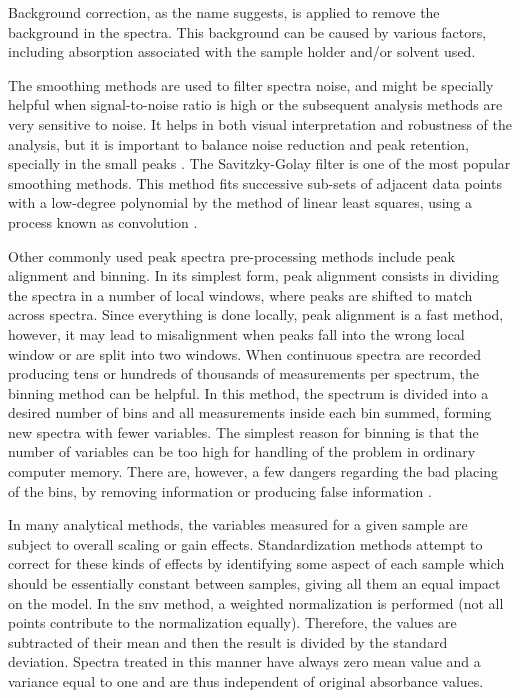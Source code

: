 Background correction, as the name suggests, is applied to remove the background in the spectra. This background can be caused by various factors, including absorption associated with the sample holder and/or solvent used. 

The smoothing methods are used to filter spectra noise, and might be specially helpful when signal-to-noise ratio is high or the subsequent analysis methods are very sensitive to noise. It helps in both visual interpretation and robustness of the analysis, but it is important to balance noise reduction and peak retention, specially in the small peaks \citep{liland2011multivariate}. The Savitzky-Golay filter is one of the most popular smoothing methods. This method fits successive sub-sets of adjacent data points with a low-degree polynomial by the method of linear least squares, using a process known as convolution \citep{savitzky1964smoothing}.

Other commonly used peak spectra pre-processing methods include peak alignment and binning. In its simplest form, peak alignment consists in dividing the spectra in a number of local windows, where peaks are shifted to match across spectra. Since everything is done locally, peak alignment is a fast method, however, it may lead to misalignment when peaks fall into the wrong local window or are split into two windows. When continuous spectra are recorded producing tens or hundreds of thousands of measurements per spectrum, the binning method can be helpful. In this method, the spectrum is divided into a desired number of bins and all measurements inside each bin summed, forming new spectra with fewer variables. The simplest reason for binning is that the number of variables can be too high for handling of the problem in ordinary computer memory. There are, however, a few dangers regarding the bad placing of the bins, by removing information or producing false information \citep{liland2011multivariate}.

In many analytical methods, the variables measured for a given sample are subject to overall scaling or gain effects. Standardization methods attempt to correct for these kinds of effects by identifying some aspect of each sample which should be essentially constant between samples, giving all them an equal impact on the model. In the \acrfull{snv} method, a weighted normalization is performed (not all points contribute to the normalization equally). Therefore, the values are subtracted of their mean and then the result is divided by the standard deviation. Spectra treated in this manner have always zero mean value and a variance equal to one and are thus independent of original absorbance values. 


